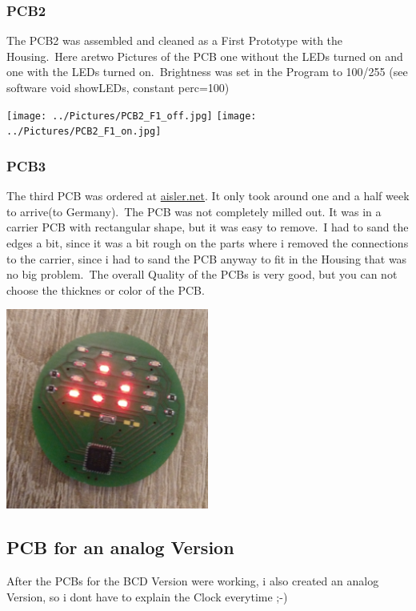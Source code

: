 \subsubsection{PCB2}
The PCB2 was assembled and cleaned as a First Prototype with the Housing.\
Here aretwo Pictures of the PCB one without the LEDs turned on and one with the LEDs turned on.\
Brightness was set in the Program to 100/255 (see software void showLEDs, constant perc=100) 
\begin{center}
\texttt{[image: ../Pictures/PCB2\_F1\_off.jpg]} \texttt{[image: ../Pictures/PCB2\_F1\_on.jpg]}

\end{center}

\subsubsection{PCB3}
The third PCB was ordered at \href{https://aisler.net}{aisler.net}. It only took around one and a half week to arrive(to Germany).\
The PCB was not completely milled out. It was in a carrier PCB with rectangular shape, but it was easy to remove.\
I had to sand the edges a bit, since it was a bit rough on the parts where i removed the connections to the carrier, since i had to sand the PCB anyway to fit in the Housing that was no big problem.\
The overall Quality of the PCBs is very good, but you can not choose the thicknes or color of the PCB.\
\begin{center}
  \includegraphics[width=0.5\textwidth]{../Pictures/PCB3.jpg}
\end{center}

\newpage
\subsection{PCB for an analog Version}
After the PCBs for the BCD Version were working, i also created an analog Version, so i dont have to explain the Clock everytime ;-)

